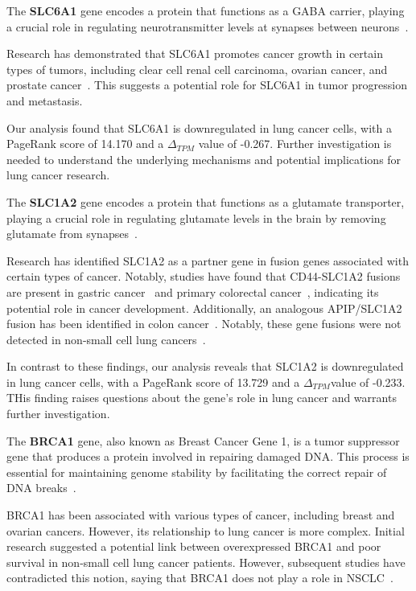 The \textbf{SLC6A1} gene encodes a protein that functions as a GABA carrier,
playing a crucial role in regulating neurotransmitter levels at synapses between neurons~\cite{Chen2020SLC6A1}.

Research has demonstrated that SLC6A1 promotes cancer growth in certain types of tumors,
including clear cell renal cell carcinoma, ovarian cancer, and prostate cancer~\cite{Chen2020SLC6A1}.
This suggests a potential role for SLC6A1 in tumor progression and metastasis.

Our analysis found that SLC6A1 is downregulated in lung cancer cells,
with a PageRank score of 14.170 and a $\Delta_{TPM}$ value of -0.267.
Further investigation is needed to understand the underlying mechanisms and potential implications for lung cancer research.
\newline

The \textbf{SLC1A2} gene encodes a protein that functions as a glutamate transporter,
playing a crucial role in regulating glutamate levels in the brain by removing glutamate from synapses~\cite{NCBI2017SLC1A2}.

Research has identified SLC1A2 as a partner gene in fusion genes associated with certain types of cancer.
Notably, studies have found that CD44-SLC1A2 fusions are present in gastric cancer~\cite{Tao2011CD44} and
primary colorectal cancer~\cite{Shinmura2015CD44}, indicating its potential role in cancer development.
Additionally, an analogous APIP/SLC1A2 fusion has been identified in colon cancer~\cite{Giacomini2013Breakpoint}.
Notably, these gene fusions were not detected in non-small cell lung cancers~\cite{Shinmura2015CD44}.

In contrast to these findings, our analysis reveals that SLC1A2 is downregulated in lung cancer cells,
with a PageRank score of 13.729 and a $\Delta_{TPM}$value of -0.233.
THis finding raises questions about the gene's role in lung cancer and warrants further investigation.
\newline

The \textbf{BRCA1} gene, also known as Breast Cancer Gene 1, is a tumor suppressor gene
that produces a protein involved in repairing damaged DNA\@.
This process is essential for maintaining genome stability by facilitating the correct repair of DNA breaks~\cite{NCI2020BRCA1}.

BRCA1 has been associated with various types of cancer, including breast and ovarian cancers\cite{Lee2020BRCA1}.
However, its relationship to lung cancer is more complex.
Initial research suggested a potential link between overexpressed BRCA1 and
poor survival in non-small cell lung cancer patients\cite{Rosell2007BRCA1}.
However, subsequent studies have contradicted this notion,
saying that BRCA1 does not play a role in NSCLC~\cite{Gachechiladze2012BRCA1,Lee2020BRCA1}.

